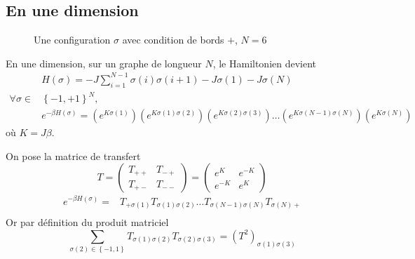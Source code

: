 \documentclass[french]{beamer}
\begin{document}
%
\subsection{En une dimension}
%

\begin{frame}
\begin{figure}
    \centering
    \caption{Une configuration $\sigma$ avec condition de bords $+$, $N = 6$}
\end{figure}

En une dimension, sur un graphe de longueur $N$, le Hamiltonien devient
\begin{align*}
&H(\sigma) = -J \sum_{i = 1}^{N - 1} \sigma(i) \sigma(i + 1) - J \sigma(1) -J\sigma(N) \\
 \forall \sigma \in &\left\{-1, +1\right\}^N,\\
&e^{-\beta H(\sigma)} = (e^{K\sigma(1)})(e^{K\sigma(1)\sigma(2)}) (e^{K\sigma(2)\sigma(3)}) \dots (e^{K\sigma(N-1)\sigma(N)}) (e^{K\sigma(N)})
\end{align*}
où $K = J \beta$.
\end{frame}

\begin{frame}
On pose la matrice de transfert
   \[T =
   \begin{pmatrix}
   T_{++} & T_{-+} \\
   T_{+-}  &  T_{--}
   \end{pmatrix}
   =
   \begin{pmatrix}
   e^{K}& e^{-K} \\
   e^{-K} & e^{K}
   \end{pmatrix}
   \]
   \begin{align*}
   e^{-\beta H(\sigma)} =& T_{+\sigma(1)} T_{\sigma(1)\sigma(2)} \dots T_{\sigma(N-1)\sigma(N)} T_{\sigma(N)+}\\
   \end{align*}
   Or par définition du produit matriciel\[
   \sum_{\sigma(2) \in \left\{-1, 1\right\}} T_{\sigma(1)\sigma(2)}T_{\sigma(2)\sigma(3)} = \left(T^2\right)_{\sigma(1)\sigma(3)}
   \]
\end{frame}
\end{document}
